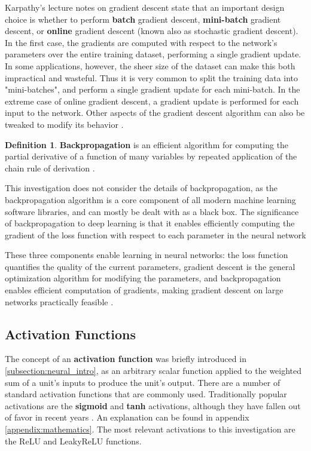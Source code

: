 \documentclass[12pt, titlepage]{report}
\theoremstyle{definition}
\newtheorem{definition}{Definition}
\begin{document}
Karpathy's lecture notes on gradient descent state that an important design choice is whether to perform \textbf{batch} gradient descent, \textbf{mini-batch} gradient descent, or \textbf{online} gradient descent (known also as stochastic gradient descent). In the first case, the gradients are computed with respect to the network's parameters over the entire training dataset, performing a single gradient update. In some applications, however, the sheer size of the dataset can make this both impractical and wasteful. Thus it is very common to split the training data into "mini-batches", and perform a single gradient update for each mini-batch. In the extreme case of online gradient descent, a gradient update is performed for each input to the network. Other aspects of the gradient descent algorithm can also be tweaked to modify its behavior \cite[Optimization: Stochastic Gradient Descent]{karpathy2017cs231n}. 

\begin{definition}
\textbf{Backpropagation} is an efficient algorithm for computing the partial derivative of a function of many variables by repeated application of the chain rule of derivation \cite[Backpropagation, Intuitions]{karpathy2017cs231n}. 
\end{definition}

This investigation does not consider the details of backpropagation, as the backpropagation algorithm is a core component of all modern machine learning software libraries, and can mostly be dealt with as a black box. The significance of backpropagation to deep learning is that it enables efficiently computing the gradient of the loss function with respect to each parameter in the neural network \cite[Backpropagation, Intuitions]{karpathy2017cs231n}

These three components enable learning in neural networks: the loss function quantifies the quality of the current parameters, gradient descent is the general optimization algorithm for modifying the parameters, and backpropagation enables efficient computation of gradients, making gradient descent on large networks practically feasible \cite[Optimization: Stochastic Gradient Descent]{karpathy2017cs231n}.



\subsection{Activation Functions}
The concept of an \textbf{activation function} was briefly introduced in \ref{subsection:neural_intro}, as an arbitrary scalar function applied to the weighted sum of a unit's inputs to produce the unit's output. There are a number of standard activation functions that are commonly used. Traditionally popular activations are the \textbf{sigmoid} and \textbf{tanh} activations, although they have fallen out of favor in recent years \cite[Neural Networks Part 1: Setting up the Architecture]{karpathy2017cs231n}. An explanation can be found in appendix \ref{appendix:mathematics}. The most relevant activations to this investigation are the ReLU and LeakyReLU functions.
\end{document}
